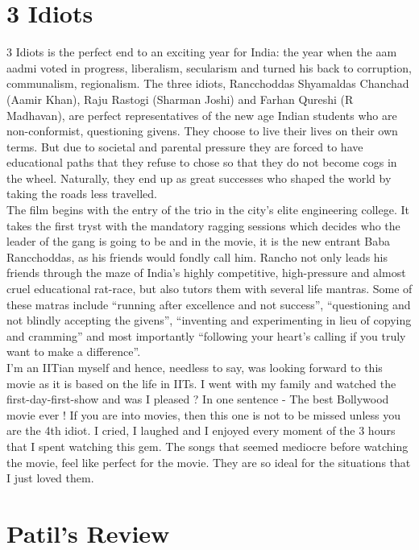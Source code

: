 \documentclass{article}
\begin{document}
\section{3 Idiots}
3 Idiots is the perfect end to an exciting year for India: the year when the aam aadmi voted in progress, liberalism, secularism and turned his back to corruption, communalism, regionalism. The three idiots, Rancchoddas Shyamaldas Chanchad (Aamir Khan), Raju Rastogi (Sharman Joshi) and Farhan Qureshi (R Madhavan), are perfect representatives of the new age Indian students who are non-conformist, questioning givens. They choose to live their lives on their own terms. But due to societal and parental pressure they are forced to have educational paths that they refuse to chose so that they do not become cogs in the wheel. Naturally, they end up as great successes who shaped the world by taking the roads less travelled.\\
The film begins with the entry of the trio in the city's elite engineering college. It takes the first tryst with the mandatory ragging sessions which decides who the leader of the gang is going to be and in the movie, it is the new entrant Baba Rancchoddas, as his friends would fondly call him. Rancho not only leads his friends through the maze of India's highly competitive, high-pressure and almost cruel educational rat-race, but also tutors them with several life mantras. Some of these matras include ``running after excellence and not success'', ``questioning and not blindly accepting the givens'', ``inventing and experimenting in lieu of copying and cramming'' and most importantly ``following your heart's calling if you truly want to make a difference''.
\\
I'm an IITian myself and hence, needless to say, was looking forward to this movie as it is based on the life in IITs. I went with my family and watched the first-day-first-show and was I pleased ? In one sentence - The best Bollywood movie ever ! If you are into movies, then this one is not to be missed unless you are the 4th idiot. I cried, I laughed and I enjoyed every moment of the 3 hours that I spent watching this gem. The songs that seemed mediocre before watching the movie, feel like perfect for the movie. They are so ideal for the situations that I just loved them.



\section{Patil's Review}
\end{document}
